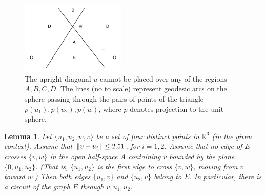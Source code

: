 \documentclass[11pt]{amsart}
\newcommand{\ring}[1]{\mathbb{#1}}
\def\|{{\hskip0.1em|\hskip-0.15em|\hskip0.1em}}
\newtheorem{lemma}{Lemma}
\begin{document}
\begin{figure}
\begin{center}
\includegraphics[width=5cm]{nogo}
\end{center}
\caption{The upright diagonal $u$ cannot be placed over any of
the regions $A,B,C,D$.  The lines (no to scale) represent geodesic arcs on the
sphere passing through the pairs of points of the triangle $p(u_1),p(u_2),p(w)$,
where $p$ denotes projection to the unit sphere.}
\label{fig:nogo}
\end{figure}

\begin{lemma}\label{lemma:circuit} 
Let $\{u_1,u_2,w,v\}$ be a set of four distinct points
in $\ring{R}^3$ (in the given context).  
Assume that
 $\|v-u_i\|\le 2.51$, for $i=1,2$.
Assume that no edge of $E$ crosses $\{v,w\}$
in the open 
half-space $A$ containing $v$ bounded by the plane $\{0,u_1,u_2\}$.
(That is, $\{u_1,u_2\}$ is the first edge to cross $\{v,w\}$, moving
from $v$ toward $w$.)
Then 
both edges $\{u_1,v\}$ and $\{u_2,v\}$ belong to $E$.
In particular, there is a circuit of the graph $E$ through $v,u_1,u_2$.
\end{lemma}
\end{document}
